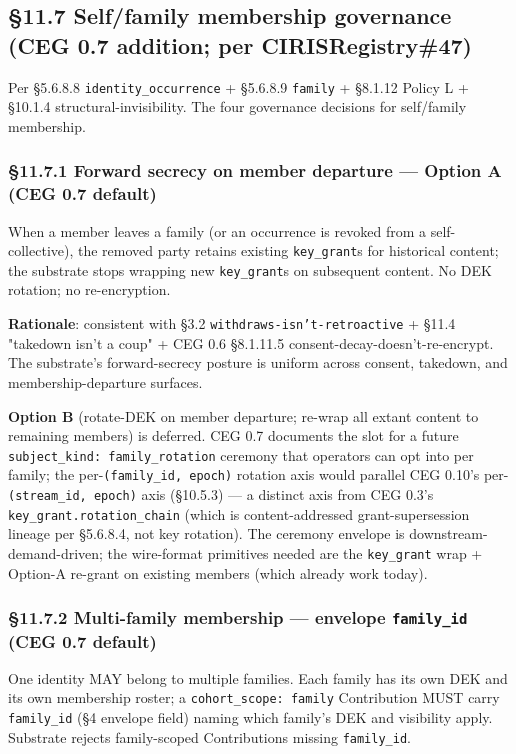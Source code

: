 \documentclass[11pt]{article}
\begin{document}
\subsection*{§11.7 Self/family membership governance (CEG 0.7 addition; per CIRISRegistry\#47)}


Per §5.6.8.8 \texttt{identity\_occurrence} + §5.6.8.9 \texttt{family} + §8.1.12 Policy L + §10.1.4 structural-invisibility. The four governance decisions for self/family membership.


\subsubsection*{§11.7.1 Forward secrecy on member departure — Option A (CEG 0.7 default)}


When a member leaves a family (or an occurrence is revoked from a self-collective), the removed party retains existing \texttt{key\_grant}s for historical content; the substrate stops wrapping new \texttt{key\_grant}s on subsequent content. No DEK rotation; no re-encryption.


\textbf{Rationale}: consistent with §3.2 \texttt{withdraws-isn't-retroactive} + §11.4 "takedown isn't a coup" + CEG 0.6 §8.1.11.5 consent-decay-doesn't-re-encrypt. The substrate's forward-secrecy posture is uniform across consent, takedown, and membership-departure surfaces.


\textbf{Option B} (rotate-DEK on member departure; re-wrap all extant content to remaining members) is deferred. CEG 0.7 documents the slot for a future \texttt{subject\_kind: family\_rotation} ceremony that operators can opt into per family; the per-\texttt{(family\_id, epoch)} rotation axis would parallel CEG 0.10's per-\texttt{(stream\_id, epoch)} axis (§10.5.3) — a distinct axis from CEG 0.3's \texttt{key\_grant.rotation\_chain} (which is content-addressed grant-supersession lineage per §5.6.8.4, not key rotation). The ceremony envelope is downstream-demand-driven; the wire-format primitives needed are the \texttt{key\_grant} wrap + Option-A re-grant on existing members (which already work today).


\subsubsection*{§11.7.2 Multi-family membership — envelope \texttt{family\_id} (CEG 0.7 default)}


One identity MAY belong to multiple families. Each family has its own DEK and its own membership roster; a \texttt{cohort\_scope: family} Contribution MUST carry \texttt{family\_id} (§4 envelope field) naming which family's DEK and visibility apply. Substrate rejects family-scoped Contributions missing \texttt{family\_id}.
\end{document}
